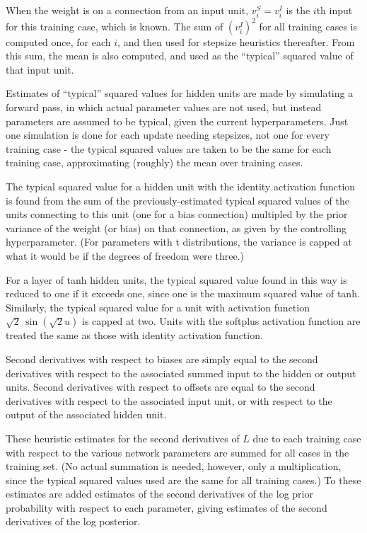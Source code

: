 \documentclass{report}[11pt]
\begin{document}
When the weight is on a connection from an input unit, $v^S_i = v^I_i$
is the $i$th input for this training case, which is known.  The sum of
$(v^I_i)^2$ for all training cases is computed once, for each $i$, and
then used for stepsize heuristics thereafter.  From this sum, the
mean is also computed, and used as the ``typical'' squared value of
that input unit.

Estimates of ``typical'' squared values for hidden units are made by
simulating a forward pass, in which actual parameter values are not
used, but instead parameters are assumed to be typical, given the
current hyperparameters.  Just one simulation is done for each update
needing stepsizes, not one for every training case - the typical
squared values are taken to be the same for each training case,
approximating (roughly) the mean over training cases.

The typical squared value for a hidden unit with the identity
activation function is found from the sum of the previously-estimated
typical squared values of the units connecting to this unit (one for a
bias connection) multipled by the prior variance of the weight (or
bias) on that connection, as given by the controlling hyperparameter.
(For parameters with t distributions, the variance is capped at what
it would be if the degrees of freedom were three.)

For a layer of tanh hidden units, the typical squared value found in
this way is reduced to one if it exceeds one, since one is the
maximum squared value of tanh.  Similarly, the typical squared value
for a unit with activation function $\sqrt{2}\,\sin(\sqrt{2}u)$ is capped
at two.  Units with the softplus activation function are treated the same as 
those with identity activation function.

Second derivatives with respect to biases are simply equal to the
second derivatives with respect to the associated summed input to the
hidden or output units.  Second derivatives with respect to offsets
are equal to the second derivatives with respect to the associated
input unit, or with respect to the output of the associated hidden
unit.

These heuristic estimates for the second derivatives of $L$ due to
each training case with respect to the various network parameters are
summed for all cases in the training set.  (No actual summation is
needed, however, only a multiplication, since the typical squared
values used are the same for all training cases.)  To these estimates
are added estimates of the second derivatives of the log prior
probability with respect to each parameter, giving estimates of the
second derivatives of the log posterior.
\end{document}
